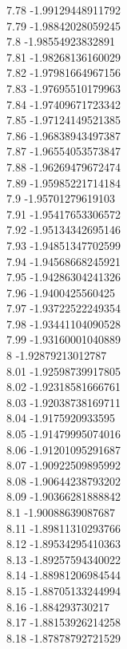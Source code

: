{7.78	-1.99129448911792\\
7.79	-1.98842028059245\\
7.8	-1.98554923832891\\
7.81	-1.98268136160029\\
7.82	-1.97981664967156\\
7.83	-1.97695510179963\\
7.84	-1.97409671723342\\
7.85	-1.97124149521385\\
7.86	-1.96838943497387\\
7.87	-1.96554053573847\\
7.88	-1.96269479672474\\
7.89	-1.95985221714184\\
7.9	-1.95701279619103\\
7.91	-1.95417653306572\\
7.92	-1.95134342695146\\
7.93	-1.94851347702599\\
7.94	-1.94568668245921\\
7.95	-1.94286304241326\\
7.96	-1.9400425560425\\
7.97	-1.93722522249354\\
7.98	-1.93441104090528\\
7.99	-1.93160001040889\\
8	-1.92879213012787\\
8.01	-1.92598739917805\\
8.02	-1.92318581666761\\
8.03	-1.92038738169711\\
8.04	-1.9175920933595\\
8.05	-1.91479995074016\\
8.06	-1.91201095291687\\
8.07	-1.90922509895992\\
8.08	-1.90644238793202\\
8.09	-1.90366281888842\\
8.1	-1.90088639087687\\
8.11	-1.89811310293766\\
8.12	-1.89534295410363\\
8.13	-1.89257594340022\\
8.14	-1.88981206984544\\
8.15	-1.88705133244994\\
8.16	-1.884293730217\\
8.17	-1.88153926214258\\
8.18	-1.87878792721529\\
}
